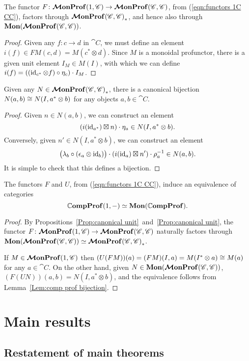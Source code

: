 \documentclass[12pt,oneside,article,draft]{memoir}
\begin{document}
\begin{proposition}\label{Prop:canonical unit}
   The functor $F\colon\bm{\mathcal{M}}\mathbf{onProf}(1,\mathscr{C})\to\bm{\mathcal{M}}\mathbf{onProf}(\mathscr{C},\mathscr{C})$, from (\ref{eqn:functors 1C CC}), factors through $\bm{\mathcal{M}}\mathbf{onProf}{(\mathscr{C},\mathscr{C})}_*$, and hence also through $\mathbf{Mon}(\bm{\mathcal{M}}\mathbf{onProf}(\mathscr{C},\mathscr{C}))$.
\end{proposition}
\begin{proof}
   Given any $f\colon c\to d$ in $\cat{C}$, we must define an element $i(f)\in FM(c,d)=M(c^*\otimes d)$.
   Since $M$ is a monoidal profunctor, there is a given unit element $I_M\in M(I)$, with which we can define $i(f)=((\operatorname{id}_{c^*}\otimes f)\circ\eta_c)\cdot I_M$.
\end{proof}

\begin{lemma}\label{Lem:comp prof bijection}
   Given any $N\in\bm{\mathcal{M}}\mathbf{onProf}{(\mathscr{C},\mathscr{C})}_*$, there is a canonical bijection $N(a,b)\cong N(I,a^*\otimes b)$ for any objects $a,b\in\cat{C}$.
\end{lemma}
\begin{proof}
   Given $n\in N(a,b)$, we can construct an element
   \[
      (i(\operatorname{id}_{a^*})\boxtimes n)\cdot\eta_a \in N(I,a^*\otimes b).
   \]
   Conversely, given $n'\in N(I,a^*\otimes b)$, we can construct an element
   \[
      \bigl(\lambda_b\circ(\epsilon_a\otimes\operatorname{id}_b)\bigr)\cdot(i(\operatorname{id}_a)\boxtimes n')\cdot\rho_a^{-1} \in N(a,b).
   \]
   It is simple to check that this defines a bijection.
\end{proof}

\begin{proposition}\label{Prop:mon prof equivalence}
   The functors $F$ and $U$, from (\ref{eqn:functors 1C CC}), induce an equivalence of categories
   \[
      \mathbb{C}\mathbf{ompProf}(1,-)\simeq\mathbf{Mon}(\mathbb{C}\mathbf{ompProf}).
   \]
\end{proposition}
\begin{proof}
   By Propositions~\ref{Prop:canonical unit}~and~\ref{Prop:canonical unit}, the functor $F\colon\bm{\mathcal{M}}\mathbf{onProf}(1,\mathscr{C}) \to \bm{\mathcal{M}}\mathbf{onProf}(\mathscr{C},\mathscr{C})$ naturally factors through $\mathbf{Mon}(\bm{\mathcal{M}}\mathbf{onProf}(\mathscr{C},\mathscr{C}))\simeq\bm{\mathcal{M}}\mathbf{onProf}{(\mathscr{C},\mathscr{C})}_*$.

   If $M\in\bm{\mathcal{M}}\mathbf{onProf}(1,\mathscr{C})$ then $(U(FM))(a)=(FM)(I,a)=M(I^*\otimes a)\cong M(a)$ for any $a\in\cat{C}$.
   On the other hand, given $N\in\mathbf{Mon}(\bm{\mathcal{M}}\mathbf{onProf}(\mathscr{C},\mathscr{C}))$, $(F(UN))(a,b)=N(I,a^*\otimes b)$, and the equivalence follows from Lemma~\ref{Lem:comp prof bijection}.
\end{proof}


\chapter{Main results}

\section{Restatement of main theorems}
\end{document}
